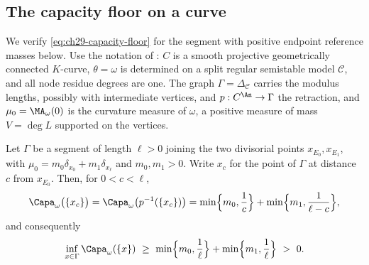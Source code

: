 \subsection{The capacity floor on a curve}
\label{sec:ch29-curve-floor}

We verify \eqref{eq:ch29-capacity-floor} for the segment with positive
endpoint reference masses below.  Use the notation of
: $C$ is a smooth projective geometrically connected
$K$-curve, $\theta=\omega$ is determined on a split regular semistable
model $\mathcal C$, and all node residue degrees are one.
The graph $\Gamma=\Delta_{\mathcal C}$ carries the modulus lengths,
possibly with intermediate vertices, and
$p:C^{\An}\to\Gamma$ the retraction, and
$\mu_0=\MA_\omega(0)$ is the curvature measure of $\omega$, a positive
measure of mass $V=\deg L$ supported on the vertices.

\begin{proposition}
\label{prop:ch29-curve-point-capacity}
Let $\Gamma$ be a segment of length $\ell>0$ joining the two divisorial
points $x_{E_0},x_{E_1}$, with
$\mu_0=m_0\delta_{x_0}+m_1\delta_{x_\ell}$ and $m_0,m_1>0$.  Write
$x_c$ for the point of $\Gamma$ at distance $c$ from $x_{E_0}$.
Then, for $0<c<\ell$,
\begin{equation}
\label{eq:ch29-curve-point-capacity}
 \Capa_\omega\bigl(\{x_c\}\bigr)
 =\Capa_\omega\bigl(p^{-1}(\{x_c\})\bigr)
 =\min\Bigl\{m_0,\frac1c\Bigr\}+\min\Bigl\{m_1,\frac1{\ell-c}\Bigr\},
\end{equation}
and consequently
\begin{equation}
\label{eq:ch29-curve-floor}
 \inf_{x\in\Gamma}\Capa_\omega(\{x\})
 \ \geq\ \min\Bigl\{m_0,\frac1\ell\Bigr\}
      +\min\Bigl\{m_1,\frac1\ell\Bigr\}\ >\ 0 .
\end{equation}
\end{proposition}


